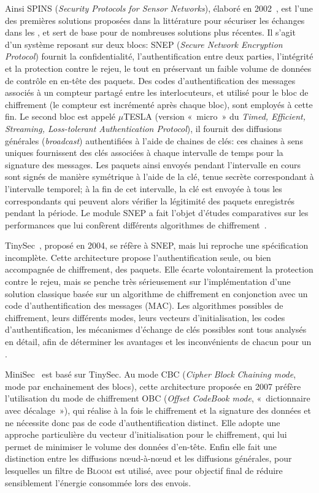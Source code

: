 Ainsi SPINS (\textit{Security Protocols for Sensor Networks}), élaboré en 2002~\cite{PSWCT02}, est l'une des premières solutions proposées dans la littérature pour sécuriser les échanges dans les \rcs, et sert de base pour de nombreuses solutions plus récentes.
Il s'agit d'un système reposant sur deux blocs: SNEP (\textit{Secure Network Encryption Protocol}) fournit la confidentialité, l'authentification entre deux parties, l'intégrité et la protection contre le rejeu, le tout en préservant un faible volume de données de contrôle en en-tête des paquets.
Des codes d'authentification des messages associés à un compteur partagé entre les interlocuteurs, et utilisé pour le bloc de chiffrement (le compteur est incrémenté après chaque bloc), sont employés à cette fin.
Le second bloc est appelé $\mu$TESLA (version « micro » du \textit{Timed, Efficient, Streaming, Loss-tolerant Authentication Protocol}), il fournit des diffusions générales (\textit{broadcast}) authentifiées à l'aide de chaines de clés: ces chaines à sens uniques fournissent des clés associées à chaque intervalle de temps pour la signature des messages.
Les paquets ainsi envoyés pendant l'intervalle en cours sont signés de manière symétrique à l'aide de la clé, tenue secrète correspondant à l'intervalle temporel; à la fin de cet intervalle, la clé est envoyée à tous les correspondants qui peuvent alors vérifier la légitimité des paquets enregistrés pendant la période.
Le module SNEP a fait l'objet d'études comparatives sur les performances que lui confèrent différents algorithmes de chiffrement~\cite{SS14-snep}.

TinySec~\cite{KSW04}, proposé en 2004, se réfère à SNEP, mais lui reproche une spécification incomplète.
Cette architecture propose l'authentification seule, ou bien accompagnée de chiffrement, des paquets.
Elle écarte volontairement la protection contre le rejeu, mais se penche très sérieusement sur l'implémentation d'une solution classique basée sur un algorithme de chiffrement en conjonction avec un code d'authentification des messages (MAC).
Les algorithmes possibles de chiffrement, leurs différents modes, leurs vecteurs d'initialisation, les codes d'authentification, les mécanismes d'échange de clés possibles sont tous analysés en détail, afin de déterminer les avantages et les inconvénients de chacun pour un \rc.

MiniSec~\cite{LMPG07} est basé sur TinySec.
Au mode CBC (\textit{Cipher Block Chaining mode}, mode par enchainement des blocs), cette architecture proposée en 2007 préfère l'utilisation du mode de chiffrement OBC (\textit{Offset CodeBook mode}, « dictionnaire avec décalage »), qui réalise à la fois le chiffrement et la signature des données et ne nécessite donc pas de code d'authentification distinct.
Elle adopte une approche particulière du vecteur d'initialisation pour le chiffrement, qui lui permet de minimiser le volume des données d'en-tête.
Enfin elle fait une distinction entre les diffusions nœud-à-nœud et les diffusions générales, pour lesquelles un filtre de \textsc{Bloom} est utilisé, avec pour objectif final de réduire sensiblement l'énergie consommée lors des envois.

